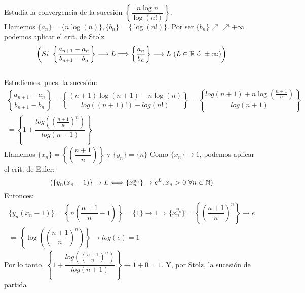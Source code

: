 \documentclass[12pt]{article}
\begin{document}
    \begin{ejercicio} Estudia la convergencia de la sucesión $\left\{\dfrac{n \log{n}}{\log(n!)}\right\}$. \\

        \noindent 
        Llamemos $\{a_n\} = \{n \log(n)\}, \{b_n\} = \{\log(n!)\}$. Por ser $\{b_n\} \nearrow\nearrow +\infty$ podemos aplicar el crit. de Stolz \\
        \begin{equation*}
            \left(Si \  \left\{\dfrac{a_{n+1} - a_n}{b_{n+1} - b_n}\right\} \longrightarrow L \Longrightarrow \left\{\dfrac{a_n}{b_n}\right\} \longrightarrow L \ (L \in {\mathbb{R}} \text{ ó } \pm \infty) \right)
        \end{equation*} \\
        Estudiemos, pues, la sucesión:
        \begin{gather*}
            \left\{\dfrac{a_{n+1} - a_n}{b_{n+1} - b_n}\right\} = \left\{\dfrac{(n+1)\log(n + 1) - n \log(n)}{log((n + 1)!) - log(n!)}\right\} = \left\{\dfrac{log(n+1) + n \log\left(\frac{n+1}{n}\right)}{log(n+1)}\right\} \\ =  \left\{1 + \dfrac{log((\frac{n+1}{n})^n)}{log(n+1)}\right\}
        \end{gather*}
        Llamemos $\{x_n\} = \left\{\left(\dfrac{n+ 1}{n}\right)\right\}$ y $\{y_n\} = \{n\}$
        Como $\{x_n\} \rightarrow 1$, podemos aplicar el crit. de Euler:
        \begin{equation*}
        (\{y_n(x_n-1)\} \rightarrow L \Longleftrightarrow \{x_n^{y_n} \} \rightarrow e^L, x_n > 0  \ \forall n \in {\mathbb{N}})
        \end{equation*}
        Entonces:
        \begin{gather*}
            \{y_n(x_n - 1)\} = \left\{n\left(\dfrac{n + 1}{n} - 1\right) \right\} = \{1\}  \rightarrow 1 \Rightarrow \{x_n^{y_n}\} = \left\{\left(\dfrac{n+1}{n}\right)^n\right\} \rightarrow e \\
            \Rightarrow \left\{\log\left(\left(\dfrac{n+1}{n}\right)^n\right)\right\} \rightarrow log(e) = 1
        \end{gather*}
        Por lo tanto, $\left\{1 + \dfrac{log((\frac{n+1}{n})^n)}{log(n+1)}\right\} \rightarrow 1 + 0 = 1$. Y, por Stolz, la sucesión de partida   \\
    \end{ejercicio}
    
\end{document}
